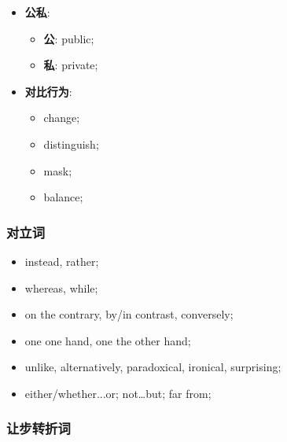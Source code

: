 \begin{multicols}{3}
\begin{itemize}
      \item \textbf{公私}:
      \begin{itemize}
        \item \textbf{公}: public;
        \item \textbf{私}: private;
      \end{itemize}

      \item \textbf{对比行为}:
      \begin{itemize}
        \item change;
        \item distinguish;
        \item mask;
        \item balance;
      \end{itemize}
    \end{itemize}
  \end{multicols}

\subsubsection{对立词}

  \begin{itemize}
    \item instead, rather;
    \item whereas, while;
    \item on the contrary, by/in contrast, conversely;
    \item one one hand, one the other hand;
    \item unlike, alternatively, paradoxical, ironical, surprising;
    \item either/whether...or; not…but; far from;
  \end{itemize}

\subsubsection{让步转折词}


